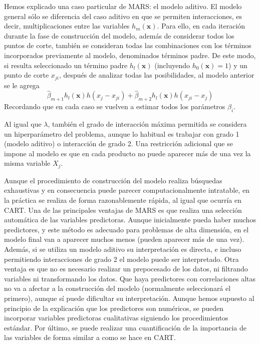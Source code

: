 \documentclass[
  spanish,
]{book}
\theoremstyle{break}
\theoremstyle{definition}
\theoremstyle{definition}
\theoremstyle{definition}
\theoremstyle{definition}
\theoremstyle{remark}
\begin{document}
Hemos explicado una caso particular de MARS: el modelo aditivo. El modelo general sólo se diferencia del caso aditivo en que se permiten interacciones, es decir, multiplicaciones entre las variables \(h_m(\mathbf{x})\).
Para ello, en cada iteración durante la fase de construcción del modelo, además de considerar todos los puntos de corte, también se consideran todas las combinaciones con los términos incorporados previamente al modelo, denominados términos padre.
De este modo, si resulta seleccionado un término padre \(h_l(\mathbf{x})\) (incluyendo \(h_0(\mathbf{x}) = 1\)) y un punto de corte \(x_{ji}\), después de analizar todas las posibilidades, al modelo anterior se le agrega
\[\hat \beta_{m+1} h_l(\mathbf{x}) h(x_j - x_{ji}) + \hat \beta_{m+2} h_l(\mathbf{x}) h(x_{ji} - x_j)\]
Recordando que en cada caso se vuelven a estimar todos los parámetros \(\beta_i\).

Al igual que \(\lambda\), también el grado de interacción máxima permitida se considera un hiperparámetro del problema, aunque lo habitual es trabajar con grado 1 (modelo aditivo) o interacción de grado 2. Una restricción adicional que se impone al modelo es que en cada producto no puede aparecer más de una vez la misma variable \(X_j\).

Aunque el procedimiento de construcción del modelo realiza búsquedas exhaustivas y en consecuencia puede parecer computacionalmente intratable, en la práctica se realiza de forma razonablemente rápida, al igual que ocurría en CART.
Una de las principales ventajas de MARS es que realiza una selección automática de las variables predictoras.
Aunque inicialmente pueda haber muchos predictores, y este método es adecuado para problemas de alta dimensión, en el modelo final van a aparecer muchos menos (pueden aparecer más de una vez).
Además, si se utiliza un modelo aditivo su interpretación es directa, e incluso permitiendo interacciones de grado 2 el modelo puede ser interpretado.
Otra ventaja es que no es necesario realizar un prepocesado de los datos, ni filtrando variables ni transformando los datos.
Que haya predictores con correlaciones altas no va a afectar a la construcción del modelo (normalmente seleccionará el primero), aunque sí puede dificultar su interpretación.
Aunque hemos supuesto al principio de la explicación que los predictores son numéricos, se pueden incorporar variables predictoras cualitativas siguiendo los procedimientos estándar.
Por último, se puede realizar una cuantificación de la importancia de las variables de forma similar a como se hace en CART.
\end{document}
